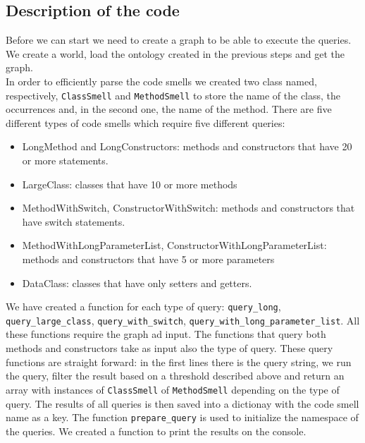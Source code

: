 \documentclass [14 pt]{article}
\begin{document}
\subsection{Description of the code}
Before we can start we need to create a graph to be able to execute the queries. We create a world, load the ontology created in the previous steps and get the graph.\\
In order to efficiently parse the code smells we created two class named, respectively, \texttt{ClassSmell} and \texttt{MethodSmell} to store the name of the class, the occurrences and, in the second one, the name of the method.
There are five different types of code smells which require five different queries:
\begin{itemize}
	\item LongMethod and LongConstructors: methods and constructors that have  20 or more statements.
	\item LargeClass: classes that have 10 or more methods
	\item MethodWithSwitch, ConstructorWithSwitch: methods and constructors that have switch statements.
	\item MethodWithLongParameterList, ConstructorWithLongParameterList: methods and constructors that have 5 or more parameters
	\item DataClass: classes that have only setters and getters.
\end{itemize}

We have created a function for each type of query: \texttt{query\_long}, \texttt{query\_large\_class}, \texttt{query\_with\_switch}, \texttt{query\_with\_long\_parameter\_list}. All these functions require the graph ad input. The functions that query both methods and constructors take as input also the type of query.
These query functions are straight forward: in the first lines there is the query string, we run the query, filter the result based on a threshold described above and return an array with instances of \texttt{ClassSmell} of \texttt{MethodSmell} depending on the type of query. The results of all queries is then saved into a dictionay with the code smell name as a key.
The function \texttt{prepare\_query} is used to initialize the namespace of the queries. We created a function to print the results on the console.
\end{document}
